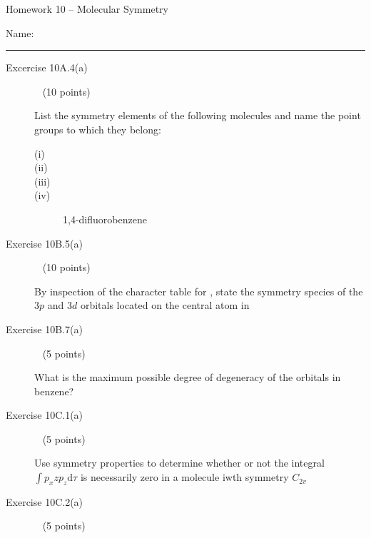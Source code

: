 \documentclass[10pt, letterpaper]{memoir}
\begin{document}
\begin{center}
	{\large Homework 10 -- Molecular Symmetry}
\end{center}

Name: \rule[-.1mm]{15em}{0.1pt}

\begin{description}
	\item [Excercise 10A.4(a)] ~ (10 points)
	
	List the symmetry elements of the following molecules and name the point groups to which they belong: 
	\begin{description} 
		\item [(i)]   %
		
		\vspace{2em}
		\item [(ii)]   %
		
		\vspace{2em}
		\item [(iii)]   %
		
		\vspace{2em}
		\item [(iv)] 1,4-difluorobenzene  %
	\end{description}
	
	\vspace{2em}
	\item [Exercise 10B.5(a)] ~ (10 points)
	
	By inspection of the character table for , state the symmetry species of the $3p$ and $3d$ orbitals located on the central  atom in   %
	
	\vspace{10em}
	\item [Exercise 10B.7(a)] ~ (5 points)
	
	What is the maximum possible degree of degeneracy of the orbitals in benzene?  %
	
	\vspace{5em}
	\item [Exercise 10C.1(a)] ~ (5 points)
	
	Use symmetry properties to determine whether or not the integral $\int p_xzp_z\mathrm{d}\tau$ is necessarily zero in a molecule iwth symmetry $C_{2v}$
	
	\vspace{5em}
	\item [Exercise 10C.2(a)] ~ (5 points)
	

\end{description}
\end{document}
